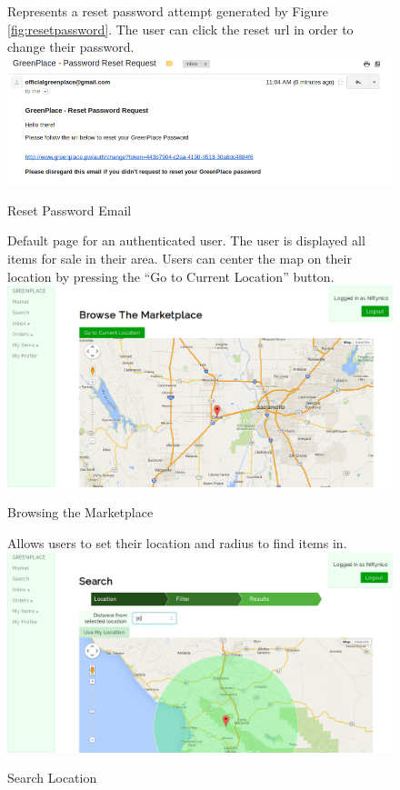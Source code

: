 \documentclass[letterpaper, 10 pt, conference]{ieeeconf}  %
\begin{document}
\begin{figure}[H]
  \caption{Reset Password Email}
  Represents a reset password attempt generated by Figure \ref{fig:resetpassword}. The user can click the reset url in order to change their password.\\
  \label{fig:resetemail}
  \centering
    \includegraphics[width=\textwidth]{images/resetemail.png}
\end{figure}

\begin{figure}[H]
  \caption{Browsing the Marketplace}
  Default page for an authenticated user. The user is displayed all items for sale in their area. Users can center the map on their location by pressing the ``Go to Current Location'' button.\\
  \label{fig:browse}
  \centering
    \includegraphics[width=\textwidth]{images/browse.png}
\end{figure}

\begin{figure}[H]
  \caption{Search Location}
  Allows users to set their location and radius to find items in.\\
  \label{fig:searchlocation}
  \centering
    \includegraphics[width=\textwidth]{images/search-location.png}
\end{figure}
\end{document}
